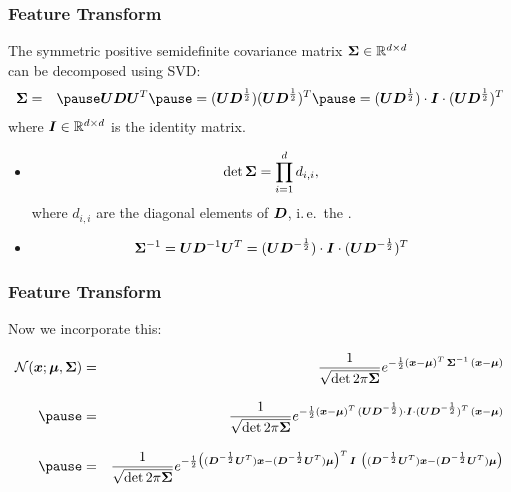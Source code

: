 \begin{frame}
  \frametitle{Feature Transform \cont}

  The symmetric positive semidefinite covariance matrix ${\bm \Sigma}\in \mathbb{R}^{d\times d}$ \\
  can be decomposed using SVD:
%  
  \begin{eqnarray*}
    \mat\Sigma&=& \pause \mat{U}\mat{D}\mat{U}^T \pause = (\mat{U}\mat{D}^{\frac{1}{2}})(\mat{U}\mat{D}^{\frac{1}{2}})^T \pause =  
    (\mat{U}\mat{D}^{\frac{1}{2}})\cdot \mat{I} \cdot(\mat{U}\mat{D}^{\frac{1}{2}})^T
  \end{eqnarray*}
%
  where ${\bm I}\in \mathbb{R}^{d\times d}$ is the identity matrix.
  \pause
   
  \begin{itemize}
    \item {}  
      \begin{displaymath}
        \det {\bm \Sigma} = \prod_{i=1}^d d_{i,i},
      \end{displaymath}
      where $d_{i,i}$ are the diagonal elements of ${\bm D}$, i.\,e.\ the . \pause
    \item {}
      \begin{displaymath}
        {\bm \Sigma}^{-1} = {\bm U}{\bm D}^{-1}{\bm U}^T
                          = ({\bm U}{\bm D}^{-\frac{1}{2}})\cdot {\bm I} \cdot({\bm U}{\bm D}^{-\frac{1}{2}})^T
      \end{displaymath}
  \end{itemize}
\end{frame}


\begin{frame}
  \frametitle{Feature Transform \cont}
 
   Now we incorporate this:
   
  \begin{eqnarray*}
    \mathcal {N} (\vec x ;\vec {\mu}, \mat\Sigma) 
      &=& \frac{1}{\sqrt{\det 2\pi  \mat\Sigma}} 
          e^{-\frac{1}{2}(\vec x -\vec{\mu})^T \, \mat\Sigma^{-1} \, (\vec x - \vec{\mu})} \\[.3cm] \pause
      &=& \frac{1}{\sqrt{\det 2\pi  \mat\Sigma}} 
          e^{-\frac{1}{2}(\vec x -\vec{\mu})^T \, (\mat{U}\mat{D}^{-\frac{1}{2}})\cdot \mat{I} \cdot(\mat{U}\mat{D}^{-\frac{1}{2}})^T \, (\vec x - \vec{\mu})} \\[.3cm] \pause
      &=& \frac{1}{\sqrt{\det 2\pi  \mat\Sigma}} 
          e^{-\frac{1}{2} \big( (\mat{D}^{-\frac{1}{2}}\mat{U}^T)\vec x - (\mat{D}^{-\frac{1}{2}}\mat{U}^T)\vec\mu \big)^T \,\mat{I} ~
          \big( (\mat{D}^{-\frac{1}{2}}\mat{U}^T)\vec x- (\mat{D}^{-\frac{1}{2}}\mat{U}^T)\vec\mu \big) }
  \end{eqnarray*}
\end{frame}


